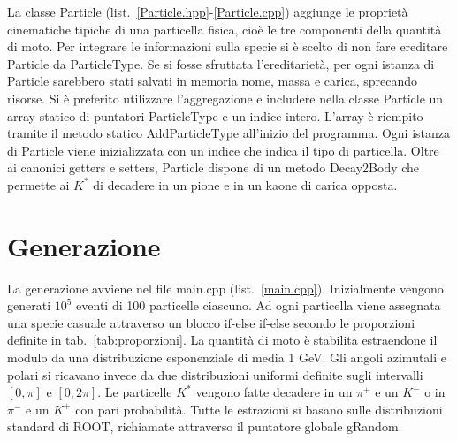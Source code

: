 \documentclass[a4paper,10pt]{article}
\begin{document}
La classe Particle (list.~\ref{Particle.hpp}-\ref{Particle.cpp}) aggiunge le proprietà cinematiche tipiche di una particella fisica, cioè le tre componenti della quantità di moto. Per integrare le informazioni sulla specie si è scelto di non fare ereditare Particle da ParticleType. Se si fosse sfruttata l'ereditarietà, per ogni istanza di Particle sarebbero stati salvati in memoria nome, massa e carica, sprecando risorse. Si è preferito utilizzare l'aggregazione e includere nella classe Particle un array statico di puntatori ParticleType e un indice intero. L'array è riempito tramite il metodo statico AddParticleType all'inizio del programma. Ogni istanza di Particle viene inizializzata con un indice che indica il tipo di particella. Oltre ai canonici getters e setters, Particle dispone di un metodo Decay2Body che permette ai $K^*$ di decadere in un pione e in un kaone di carica opposta.

\section{Generazione}
La generazione avviene nel file main.cpp (list.~\ref{main.cpp}). Inizialmente vengono generati $10^5$ eventi di 100 particelle ciascuno. Ad ogni particella viene assegnata una specie casuale attraverso un blocco if-else if-else secondo le proporzioni definite in tab.~\ref{tab:proporzioni}. La quantità di moto è stabilita estraendone il modulo da una distribuzione esponenziale di media 1 GeV. Gli angoli azimutali e polari si ricavano invece da due distribuzioni uniformi definite sugli intervalli $[0,\pi]$ e $[0,2\pi]$. Le particelle $K^*$ vengono fatte decadere in un $\pi^+$ e un $K^-$ o in $\pi^-$ e un $K^+$ con pari probabilità. Tutte le estrazioni si basano sulle distribuzioni standard di ROOT, richiamate attraverso il puntatore globale gRandom.
\end{document}
